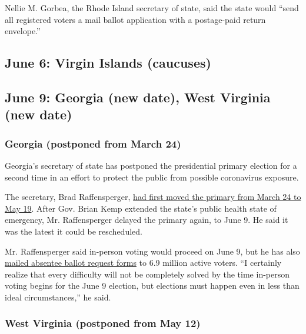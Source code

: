 Nellie M. Gorbea, the Rhode Island secretary of state, said the state
would ``send all registered voters a mail ballot application with a
postage-paid return envelope.''

\hypertarget{june-6-virgin-islands-caucuses}{%
\subsection{June 6: Virgin Islands
(caucuses)}\label{june-6-virgin-islands-caucuses}}

\hypertarget{june-9-georgia-new-date-west-virginia-new-date}{%
\subsection{June 9: Georgia (new date), West Virginia (new
date)}\label{june-9-georgia-new-date-west-virginia-new-date}}

\hypertarget{georgia-postponed-from-march-24}{%
\subsubsection{Georgia (postponed from March
24)}\label{georgia-postponed-from-march-24}}

Georgia's secretary of state has postponed the presidential primary
election for a second time in an effort to protect the public from
possible coronavirus exposure.

The secretary, Brad Raffensperger,
\href{https://www.nytimes.com/2020/03/14/us/politics/georgia-primary-virus-2020.html}{had
first moved the primary from March 24 to May 19}. After Gov. Brian Kemp
extended the state's public health state of emergency, Mr. Raffensperger
delayed the primary again, to June 9. He said it was the latest it could
be rescheduled.

Mr. Raffensperger said in-person voting would proceed on June 9, but he
has also
\href{https://www.ajc.com/news/state--regional-govt--politics/georgia-mail-absentee-ballot-request-forms-all-active-voters/s1ZcJ57g8qqIwyG6LNWfIM/}{mailed
absentee ballot request forms} to 6.9 million active voters. ``I
certainly realize that every difficulty will not be completely solved by
the time in-person voting begins for the June 9 election, but elections
must happen even in less than ideal circumstances,'' he said.

\hypertarget{west-virginia-postponed-from-may-12}{%
\subsubsection{West Virginia (postponed from May
12)}\label{west-virginia-postponed-from-may-12}}

